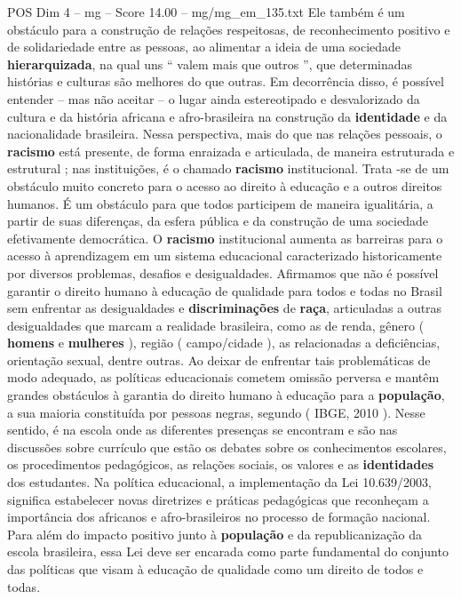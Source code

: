 \begin{textsample}{POS Dim 4 – mg – Score 14.00 – mg/mg\_em\_135.txt}
Ele também é um obstáculo para a construção de relações respeitosas, de reconhecimento positivo e de solidariedade entre as pessoas, ao alimentar a ideia de uma sociedade \textbf{hierarquizada}, na qual uns “ valem mais que outros ”, que determinadas histórias e culturas são melhores do que outras.
Em decorrência disso, é possível entender – mas não aceitar – o lugar ainda estereotipado e desvalorizado da cultura e da história africana e afro-brasileira na construção da \textbf{identidade} e da nacionalidade brasileira.
Nessa perspectiva, mais do que nas relações pessoais, o \textbf{racismo} está presente, de forma enraizada e articulada, de maneira estruturada e estrutural ; nas instituições, é o chamado \textbf{racismo} institucional.
Trata -se de um obstáculo muito concreto para o acesso ao direito à educação e a outros direitos humanos.
É um obstáculo para que todos participem de maneira igualitária, a partir de suas diferenças, da esfera pública e da construção de uma sociedade efetivamente democrática.
O \textbf{racismo} institucional aumenta as barreiras para o acesso à aprendizagem em um sistema educacional caracterizado historicamente por diversos problemas, desafios e desigualdades.
Afirmamos que não é possível garantir o direito humano à educação de qualidade para todos e todas no Brasil sem enfrentar as desigualdades e \textbf{discriminações} de \textbf{raça}, articuladas a outras desigualdades que marcam a realidade brasileira, como as de renda, gênero ( \textbf{homens} e \textbf{mulheres} ), região ( campo/cidade ), as relacionadas a deficiências, orientação sexual, dentre outras.
Ao deixar de enfrentar tais problemáticas de modo adequado, as políticas educacionais cometem omissão perversa e mantêm grandes obstáculos à garantia do direito humano à educação para a \textbf{população}, a sua maioria constituída por pessoas negras, segundo ( IBGE, 2010 ).
Nesse sentido, é na escola onde as diferentes presenças se encontram e são nas discussões sobre currículo que estão os debates sobre os conhecimentos escolares, os procedimentos pedagógicos, as relações sociais, os valores e as \textbf{identidades} dos estudantes.
Na política educacional, a implementação da Lei 10.639/2003, significa estabelecer novas diretrizes e práticas pedagógicas que reconheçam a importância dos africanos e afro-brasileiros no processo de formação nacional.
Para além do impacto positivo junto à \textbf{população} e da republicanização da escola brasileira, essa Lei deve ser encarada como parte fundamental do conjunto das políticas que visam à educação de qualidade como um direito de todos e todas.

\end{textsample}
